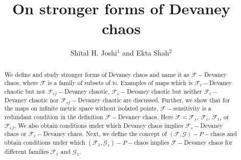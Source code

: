\documentclass{amsart}[12pt, papera4]
\theoremstyle{definition}
\theoremstyle{remark}
\numberwithin{equation}{section}
\begin{document}
	
	
	\centerline{}
	
	\centerline{}
	
	\title[On stronger forms of Devaney chaos]{On stronger forms of Devaney chaos}
	
	\author[Shital H. Joshi, Ekta Shah]{Shital H. Joshi$^1$ \MakeLowercase {and} Ekta Shah$^2$}
	
	
	\address{$^{1}$Shree M. P. Shah Arts and Science College, Surendranagar. India and Department of Mathematics, Faculty of Science, The Maharaja Sayajirao University of Baroda, Vadodara. India}
	\email{\textcolor[rgb]{0.00,0.00,0.84}{shjoshi11@gmail.com}}
	
	\address{$^{2}$Department of Mathematics, Faculty of Science, The Maharaja Sayajirao University of Baroda, Vadodara. India}
	\email{\textcolor[rgb]{0.00,0.00,0.84}{ekta19001@gmail.com}}
	
	
	
		
	\begin{abstract}
		\noindent	We define and study stronger forms of Devaney chaos and name it as $\mathscr{F}-$Devaney chaos, where $\mathscr{F}$ is a family of subsets of $\mathbb{N}$. Examples of maps which is $\mathscr{F}_t-$Devaney chaotic but not $\mathscr{F}_{cf}-$Devaney chaotic,  $\mathscr{F}_s-$Devaney chaotic but neither $\mathscr{F}_t-$Devaney chaotic nor $\mathscr{F}_{cf}-$Devaney chaotic are discussed. Further, we show that for the maps on infinite metric space without isolated points, $\mathscr{F}-$sensitivity is a redundant condition in the definition $\mathscr{F}-$Devaney chaos. Here $\mathscr{F}=\mathscr{F}_s, \: \mathscr{F}_t, \: \mathscr{F}_{ts}$ or $\mathscr{F}_{cf}$. We also obtain conditions under which Devaney chaos implies $\mathscr{F}_s-$Devaney chaos or $\mathscr{F}_t-$Devaney chaos. Next, we define the concept of $\left(\mathscr{F}, \mathscr{G}\right)-P-$chaos and obtain conditions under which $\left(\mathscr{F}_1, \mathscr{G}_1\right)-P-$chaos implies $\mathscr{F}-$Devaney chaos for different families $\mathscr{F}_1$ and $\mathscr{G}_1$.
	
	\end{abstract}
	\maketitle
	
\end{document}
